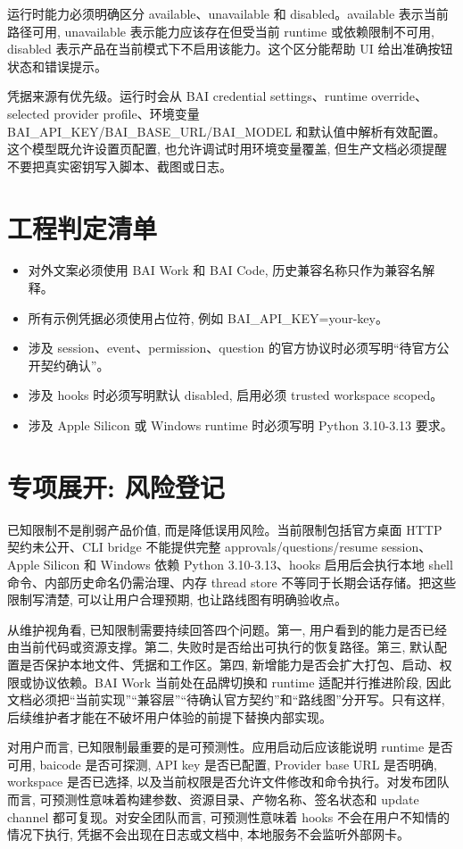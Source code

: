 运行时能力必须明确区分 available、unavailable 和 disabled。available 表示当前路径可用, unavailable 表示能力应该存在但受当前 runtime 或依赖限制不可用, disabled 表示产品在当前模式下不启用该能力。这个区分能帮助 UI 给出准确按钮状态和错误提示。

凭据来源有优先级。运行时会从 BAI credential settings、runtime override、selected provider profile、环境变量 BAI\_API\_KEY/BAI\_BASE\_URL/BAI\_MODEL 和默认值中解析有效配置。这个模型既允许设置页配置, 也允许调试时用环境变量覆盖, 但生产文档必须提醒不要把真实密钥写入脚本、截图或日志。

\section{工程判定清单}
\begin{itemize}
  \item 对外文案必须使用 BAI Work 和 BAI Code, 历史兼容名称只作为兼容名解释。
  \item 所有示例凭据必须使用占位符, 例如 BAI\_API\_KEY=your-key。
  \item 涉及 session、event、permission、question 的官方协议时必须写明“待官方公开契约确认”。
  \item 涉及 hooks 时必须写明默认 disabled, 启用必须 trusted workspace scoped。
  \item 涉及 Apple Silicon 或 Windows runtime 时必须写明 Python 3.10-3.13 要求。
\end{itemize}

\section{专项展开: 风险登记}
已知限制不是削弱产品价值, 而是降低误用风险。当前限制包括官方桌面 HTTP 契约未公开、CLI bridge 不能提供完整 approvals/questions/resume session、Apple Silicon 和 Windows 依赖 Python 3.10-3.13、hooks 启用后会执行本地 shell 命令、内部历史命名仍需治理、内存 thread store 不等同于长期会话存储。把这些限制写清楚, 可以让用户合理预期, 也让路线图有明确验收点。

从维护视角看, 已知限制需要持续回答四个问题。第一, 用户看到的能力是否已经由当前代码或资源支撑。第二, 失败时是否给出可执行的恢复路径。第三, 默认配置是否保护本地文件、凭据和工作区。第四, 新增能力是否会扩大打包、启动、权限或协议依赖。BAI Work 当前处在品牌切换和 runtime 适配并行推进阶段, 因此文档必须把“当前实现”“兼容层”“待确认官方契约”和“路线图”分开写。只有这样, 后续维护者才能在不破坏用户体验的前提下替换内部实现。

对用户而言, 已知限制最重要的是可预测性。应用启动后应该能说明 runtime 是否可用, baicode 是否可探测, API key 是否已配置, Provider base URL 是否明确, workspace 是否已选择, 以及当前权限是否允许文件修改和命令执行。对发布团队而言, 可预测性意味着构建参数、资源目录、产物名称、签名状态和 update channel 都可复现。对安全团队而言, 可预测性意味着 hooks 不会在用户不知情的情况下执行, 凭据不会出现在日志或文档中, 本地服务不会监听外部网卡。

